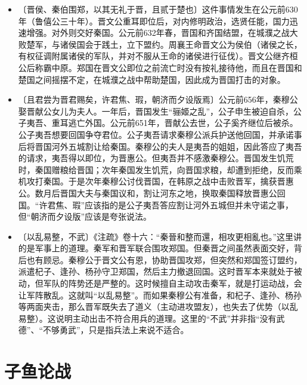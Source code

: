 \documentclass[12pt,UTF-8,openany,a4]{ctexbook}
\begin{document}
\begin{itemize}
    \setlength\itemsep{-0.2em}
    \item〔晋侯、秦伯围郑，以其无礼于晋，且贰于楚也〕{\yiwen 这件事情发生在公元前630年（鲁僖公三十年）。晋文公重耳即位后，对内修明政治，选贤任能，国力迅速增强。对外则交好秦国。公元前632年春，晋国和齐国结盟，在城濮之战大败楚军，与诸侯国会于践土，立下盟约。周襄王命晋文公为侯伯（诸侯之长，有权征调附属诸侯的军队，并对不服从王命的诸侯进行征伐）。晋文公继齐桓公后称霸中原。郑国在晋文公即位之前流亡时没有按礼接待他，而且在晋国和楚国之间摇摆不定，在城濮之战中帮助楚国，因此成为晋国打击的对象。}
    \item〔且君尝为晋君赐矣，许君焦、瑕，朝济而夕设版焉〕{\yiwen 公元前656年，秦穆公娶晋献公女儿为夫人。一年后，晋国发生“骊姬之乱”，公子申生被迫自杀，公子夷吾、重耳逃亡外国。公元前651年，晋献公去世，公子奚齐继位后被杀。公子夷吾想要回国争夺君位。公子夷吾请求秦穆公派兵护送他回国，并承诺事后将晋国河外五城割让给秦国。秦穆公的夫人是夷吾的姐姐，因此答应了夷吾的请求，夷吾得以即位，为晋惠公。但夷吾并不感激秦穆公。晋国发生饥荒时，秦国赠粮给晋国；次年秦国发生饥荒，向晋国求粮，却遭到拒绝，反而乘机攻打秦国。于是次年秦穆公讨伐晋国，在韩原之战中击败晋军，擒获晋惠公。数月后晋国大夫与秦国议和，割让河东之地，换取秦国释放晋惠公回国。“许君焦、瑕”应该指的是公子夷吾答应割让河外五城但并未守诺之事，但“朝济而夕设版”应该是夸张说法。}
    \item〔以乱易整，不武〕{\yiwen 《注疏》卷十六：“秦晉和整而還，相攻更相亂也。”这里讲的是军事上的道理。秦军和晋军联合围攻郑国。但秦晋之间虽然表面交好，背后也有顾忌。秦穆公于晋文公有恩，协助晋国攻郑，但突然和郑国签订盟约，派遣杞子、逢孙、杨孙守卫郑国，然后主力撤退回国。这时晋军本来就处于被动，但军队的阵势还是严整的。这时候擅自主动攻击秦军，就是打运动战，会让军阵散乱。这就叫“以乱易整”。而如果秦穆公有准备，和杞子、逢孙、杨孙等两面夹击，那么晋军既失去了道义（主动进攻盟友），也失去了优势（以乱易整）。这说明主动出击不符合用兵的道理。这里的“不武”并非指“没有武德”、“不够勇武”，只是指兵法上来说不适合。}
\end{itemize}


\chapter{子鱼论战}
\end{document}
